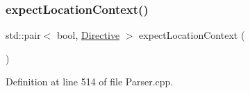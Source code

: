 \mbox{\label{classft_1_1_parser_a002b236022851df6ef2203aab9b24a73}} 
\subsubsection{\texorpdfstring{expect\+Location\+Context()}{expectLocationContext()}}
{\footnotesize\ttfamily std\+::pair$<$ bool, \hyperlink{classft_1_1_directive}{Directive} $>$ expect\+Location\+Context (\begin{DoxyParamCaption}{ }\end{DoxyParamCaption})}



Definition at line 514 of file Parser.\+cpp.


